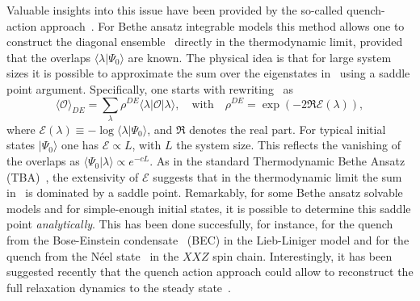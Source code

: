 \documentclass[11pt]{iopart}
\begin{document}
Valuable insights into this issue have been provided by the so-called quench-action 
approach~\cite{caux-2013}. For Bethe ansatz integrable models this method allows one 
to construct the diagonal ensemble~ directly in the thermodynamic 
limit, provided that the overlaps $\langle\lambda|\Psi_0\rangle$ are known. The 
physical idea is that for large system sizes it is possible to approximate the sum 
over the eigenstates in~ using a saddle point argument. Specifically, 
one starts with rewriting~ as 
%
\begin{equation}
\label{de1}
\langle{\mathcal O}\rangle_{DE}= \sum\limits_{\lambda}\rho^{DE}\langle\lambda|
{\mathcal O}|\lambda\rangle,\quad\textrm{with}\quad\rho^{DE}=\exp(-2\Re{\mathcal 
E}(\lambda)), 
\end{equation}
%
where ${\mathcal E}(\lambda)\equiv-\log\langle\lambda|\Psi_0\rangle$, and $\Re$ 
denotes the real part. For typical initial states $|\Psi_0\rangle$
one has ${\mathcal E}\propto L$, with $L$ the system size. This reflects the 
vanishing of the overlaps as $\langle\Psi_0|\lambda\rangle\propto e^{-c L}$.  
As in the standard Thermodynamic Bethe Ansatz (TBA)~\cite{taka-book}, the 
extensivity of ${\mathcal E}$ suggests that in the thermodynamic limit the 
sum in~ is dominated by a saddle point. Remarkably, for some Bethe 
ansatz solvable models and for simple-enough initial states, it is possible to 
determine this saddle point {\it analytically}. This has been done succesfully, 
for instance, for the quench from the Bose-Einstein condensate~\cite{de-nardis-2014} 
(BEC) in the Lieb-Liniger model and for the quench from the N\'eel 
state~\cite{wouters-2014,brockmann-2014} in the $XXZ$ spin chain. Interestingly, 
it has been suggested recently that the quench action approach could allow to 
reconstruct the full relaxation dynamics to the steady state~\cite{de-nardis-2015a,
de-nardis-2015}. 
\end{document}
